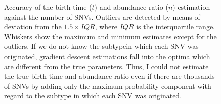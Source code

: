 \documentclass{article}
\begin{document}
\begin{figure}[H]
   \caption{
 Accuracy of the birth time ($t$) and abundance ratio ($n$) estimation against the number of SNVs. Outliers are detected by means of deviation from the $1.5 \times IQR$, where $IQR$ is the interquartile range. Whiskers show the maximum and minimum estimates except for the outliers. If we do not know the subtypein which each SNV was originated, gradient descent estimations fall into the optima which are different from the true parameters. Thus, I could not estimate the true birth time and abundance ratio even if there are thousands of SNVs by adding only the maximum probability component with regard to the subtype in which each SNV was originated.
  }
 \label{fig: binom_subtype_ungiven_mle}
\end{figure}
\end{document}
